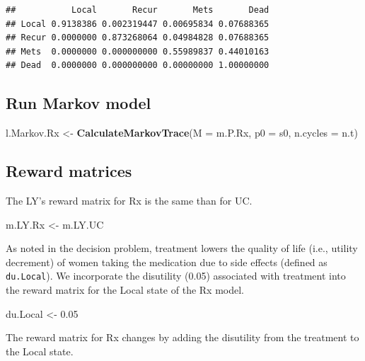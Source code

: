 \documentclass[]{article}
\newenvironment{Shaded}{\begin{snugshade}}{\end{snugshade}}
\newcommand{\KeywordTok}[1]{\textcolor[rgb]{0.13,0.29,0.53}{\textbf{#1}}}
\newcommand{\DataTypeTok}[1]{\textcolor[rgb]{0.13,0.29,0.53}{#1}}
\newcommand{\FloatTok}[1]{\textcolor[rgb]{0.00,0.00,0.81}{#1}}
\newcommand{\StringTok}[1]{\textcolor[rgb]{0.31,0.60,0.02}{#1}}
\newcommand{\NormalTok}[1]{#1}
\theoremstyle{definition}
\theoremstyle{definition}
\theoremstyle{definition}
\theoremstyle{remark}
\begin{document}
\begin{verbatim}
##           Local       Recur       Mets       Dead
## Local 0.9138386 0.002319447 0.00695834 0.07688365
## Recur 0.0000000 0.873268064 0.04984828 0.07688365
## Mets  0.0000000 0.000000000 0.55989837 0.44010163
## Dead  0.0000000 0.000000000 0.00000000 1.00000000
\end{verbatim}

\subsection{Run Markov model}\label{run-markov-model-1}

\begin{Shaded}
\begin{Highlighting}[]
\NormalTok{l.Markov.Rx <-}\StringTok{ }\KeywordTok{CalculateMarkovTrace}\NormalTok{(}\DataTypeTok{M =}\NormalTok{ m.P.Rx, }\DataTypeTok{p0 =}\NormalTok{ s0, }\DataTypeTok{n.cycles =}\NormalTok{ n.t)}
\end{Highlighting}
\end{Shaded}

\subsection{Reward matrices}\label{reward-matrices}

The LY's reward matrix for Rx is the same than for UC.

\begin{Shaded}
\begin{Highlighting}[]
\NormalTok{m.LY.Rx <-}\StringTok{ }\NormalTok{m.LY.UC}
\end{Highlighting}
\end{Shaded}

As noted in the decision problem, treatment lowers the quality of life
(i.e., utility decrement) of women taking the medication due to side
effects (defined as \texttt{du.Local}). We incorporate the disutility
(0.05) associated with treatment into the reward matrix for the Local
state of the Rx model.

\begin{Shaded}
\begin{Highlighting}[]
\NormalTok{du.Local <-}\StringTok{ }\FloatTok{0.05}
\end{Highlighting}
\end{Shaded}

The reward matrix for Rx changes by adding the disutility from the
treatment to the Local state.
\end{document}
